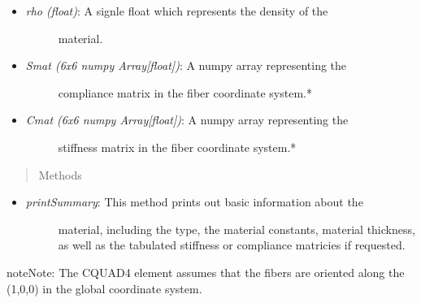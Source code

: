 \documentclass[letterpaper,10pt,english]{sphinxmanual}
\begin{document}
\begin{fulllineitems}
\begin{itemize}
\begin{description}
\end{description}

\item {} \begin{description}
\item[{\emph{rho (float)}: A signle float which represents the density of the}] \leavevmode
material.

\end{description}

\item {} \begin{description}
\item[{\emph{Smat (6x6 numpy Array{[}float{]})}: A numpy array representing the}] \leavevmode
compliance matrix in the fiber coordinate system.*

\end{description}

\item {} \begin{description}
\item[{\emph{Cmat (6x6 numpy Array{[}float{]})}: A numpy array representing the}] \leavevmode
stiffness matrix in the fiber coordinate system.*

\end{description}

\end{itemize}
\begin{quote}\begin{description}
\item[{Methods}] \leavevmode
\end{description}\end{quote}
\begin{itemize}
\item {} \begin{description}
\item[{\emph{printSummary}: This method prints out basic information about the}] \leavevmode
material, including the type, the material constants, material
thickness, as well as the tabulated stiffness or compliance
matricies if requested.

\end{description}

\end{itemize}

\begin{notice}{note}{Note:}
The CQUAD4 element assumes that the fibers are oriented along
the (1,0,0) in the global coordinate system.
\end{notice}


\end{fulllineitems}
\end{document}
